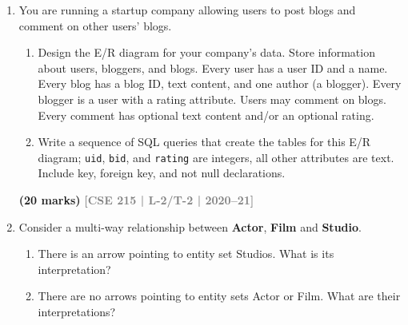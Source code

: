 \documentclass[12pt]{article}
\newcommand{\yr}[1]{\hfill\textcolor{gray}{\small\textbf{[#1]}}}
\newcommand{\mk}[1]{\textcolor{orange!70!black}{\small\textbf{(#1 marks)}}}
\begin{document}
\begin{enumerate}
\begin{enumerate}
  \item Enroll is a strong entity set.
  \item All teachers must teach courses.
  \item All students must enroll in courses.
  \item All courses must be enrolled by students.
  \item All courses must be taught by teachers.
  \item Each course is taught by only one teacher.
  \item Each course is enrolled by only one student.
  \item Each teacher may teach many courses.
  \item Each student can enroll in many courses.
  \item Teacher is a relationship set.
\end{enumerate}
\mk{10} \yr{CSE 215 | L-2/T-2 | 2020--21}


\item You are running a startup company allowing users to post blogs and comment on other users' blogs.
\begin{enumerate}
  \item Design the E/R diagram for your company's data. Store information about users, bloggers, and blogs. Every user has a user ID and a name. Every blog has a blog ID, text content, and one author (a blogger). Every blogger is a user with a rating attribute. Users may comment on blogs. Every comment has optional text content and/or an optional rating.
  \item Write a sequence of SQL queries that create the tables for this E/R diagram; \texttt{uid}, \texttt{bid}, and \texttt{rating} are integers, all other attributes are text. Include key, foreign key, and not null declarations.
\end{enumerate}
\mk{20} \yr{CSE 215 | L-2/T-2 | 2020--21}


\item Consider a multi-way relationship between \textbf{Actor}, \textbf{Film} and \textbf{Studio}.
\begin{enumerate}
  \item There is an arrow pointing to entity set Studios. What is its interpretation?
  \item There are no arrows pointing to entity sets Actor or Film. What are their interpretations?
\end{enumerate}
\begin{center}
  \begin{tikzpicture}[
        thick,
        entity/.style={draw, rectangle, minimum width=2.5cm, minimum height=0.8cm, align=center},
        relationship/.style={draw, diamond, aspect=1.5, minimum width=2.5cm, minimum height=1.5cm, align=center, pattern=crosshatch dots, pattern color=gray}
    ]
    

\end{tikzpicture}
\end{center}
\end{enumerate}
\end{document}
